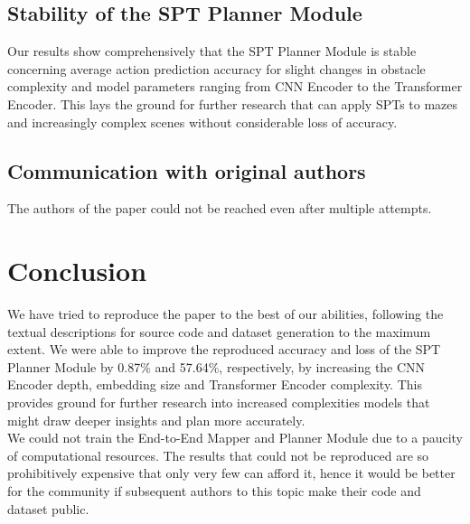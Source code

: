 \subsection{Stability of the SPT Planner Module}
Our results show comprehensively that the SPT Planner Module is stable concerning average action prediction accuracy for slight changes in obstacle complexity and model parameters ranging from CNN Encoder to the Transformer Encoder. This lays the ground for further research that can apply SPTs to mazes and increasingly complex scenes without considerable loss of accuracy.

\vspace{-5pt}
\subsection{Communication with original authors}
The authors of the paper could not be reached even after multiple attempts.
\vspace{-5pt}
\section{Conclusion}
We have tried to reproduce the paper to the best of our abilities, following the textual descriptions for source code and dataset generation to the maximum extent. We were able to improve the reproduced accuracy and loss of the SPT Planner Module by 0.87\% and 57.64\%, respectively, by increasing the CNN Encoder depth, embedding size and Transformer Encoder complexity. This provides ground for further research into increased complexities models that might draw deeper insights and plan more accurately. \\ 
We could not train the End-to-End Mapper and Planner Module due to a paucity of computational resources. The results that could not be reproduced are so prohibitively expensive that only very few can afford it, hence it would be better for the community if subsequent authors to this topic make their code and dataset public.


